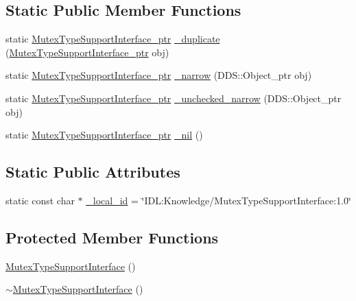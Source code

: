 \subsection*{Static Public Member Functions}
\begin{DoxyCompactItemize}
\item 
static \hyperlink{classKnowledge_1_1MutexTypeSupportInterface}{MutexTypeSupportInterface\_\-ptr} \hyperlink{classKnowledge_1_1MutexTypeSupportInterface_ac4301f1cd3f8a0d6dfc6c4094e405b4b}{\_\-duplicate} (\hyperlink{classKnowledge_1_1MutexTypeSupportInterface}{MutexTypeSupportInterface\_\-ptr} obj)
\item 
static \hyperlink{classKnowledge_1_1MutexTypeSupportInterface}{MutexTypeSupportInterface\_\-ptr} \hyperlink{classKnowledge_1_1MutexTypeSupportInterface_a924161ab92405d5c61f18bca1bda6c9a}{\_\-narrow} (DDS::Object\_\-ptr obj)
\item 
static \hyperlink{classKnowledge_1_1MutexTypeSupportInterface}{MutexTypeSupportInterface\_\-ptr} \hyperlink{classKnowledge_1_1MutexTypeSupportInterface_a52d5fbe72b04d4b33c3db4f866ae18b5}{\_\-unchecked\_\-narrow} (DDS::Object\_\-ptr obj)
\item 
static \hyperlink{classKnowledge_1_1MutexTypeSupportInterface}{MutexTypeSupportInterface\_\-ptr} \hyperlink{classKnowledge_1_1MutexTypeSupportInterface_afc54d77df8f3c9cd8063120a0a2a3089}{\_\-nil} ()
\end{DoxyCompactItemize}
\subsection*{Static Public Attributes}
\begin{DoxyCompactItemize}
\item 
static const char $\ast$ \hyperlink{classKnowledge_1_1MutexTypeSupportInterface_aec95feffd553260da137b77eac94de1c}{\_\-local\_\-id} = \char`\"{}IDL:Knowledge/MutexTypeSupportInterface:1.0\char`\"{}
\end{DoxyCompactItemize}
\subsection*{Protected Member Functions}
\begin{DoxyCompactItemize}
\item 
\hyperlink{classKnowledge_1_1MutexTypeSupportInterface_a666516d2564f080ef80b9ce4c586dc30}{MutexTypeSupportInterface} ()
\item 
\hyperlink{classKnowledge_1_1MutexTypeSupportInterface_a82b0c3d564377937e333581a823b9582}{$\sim$MutexTypeSupportInterface} ()
\end{DoxyCompactItemize}
